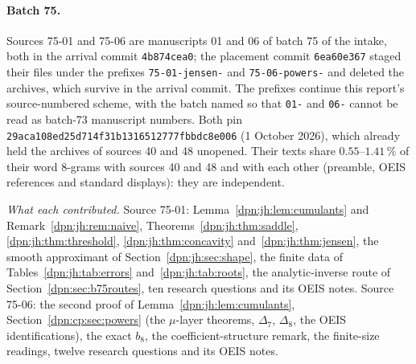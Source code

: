 \documentclass[11pt]{article}
\numberwithin{equation}{section}
\theoremstyle{definition}\newtheorem{definition}[theorem]{Definition}
\theoremstyle{remark}\newtheorem{remark}[theorem]{Remark}
\newcommand{\file}[1]{\nolinkurl{#1}}
\begin{document}
\paragraph{Batch 75.}
Sources 75-01 and 75-06 are manuscripts 01 and 06 of batch 75 of the intake,
both in the arrival commit \texttt{4b874cea0}; the placement commit
\texttt{6ea60e367} staged their files under the prefixes \file{75-01-jensen-}
and \file{75-06-powers-} and deleted the archives, which survive in the
arrival commit.  The prefixes continue this report's source-numbered scheme,
with the batch named so that \file{01-} and \file{06-} cannot be read as
batch-73 manuscript numbers.  Both pin
\texttt{29aca108ed25d714f31b1316512777fbbdc8e006} (1 October 2026), which
already held the archives of sources 40 and 48 unopened.  Their texts share
$0.55$--$1.41\,\%$ of their word 8-grams with sources 40 and 48 and with each
other (preamble, OEIS references and standard displays): they are independent.

\emph{What each contributed.}  Source 75-01: Lemma~\ref{dpn:jh:lem:cumulants}
and Remark~\ref{dpn:jh:rem:naive}, Theorems~\ref{dpn:jh:thm:saddle},
\ref{dpn:jh:thm:threshold}, \ref{dpn:jh:thm:concavity} and~\ref{dpn:jh:thm:jensen},
the smooth approximant of Section~\ref{dpn:jh:sec:shape}, the finite data of
Tables~\ref{dpn:jh:tab:errors} and~\ref{dpn:jh:tab:roots}, the analytic-inverse
route of Section~\ref{dpn:sec:b75routes}, ten research questions and its OEIS
notes.  Source 75-06: the second proof of
Lemma~\ref{dpn:jh:lem:cumulants}, Section~\ref{dpn:cp:sec:powers} (the
$\mu$-layer theorems, $\Delta_7$, $\Delta_8$, the OEIS identifications), the
exact $b_8$, the coefficient-structure remark, the finite-size readings,
twelve research questions and its OEIS notes.
\end{document}
